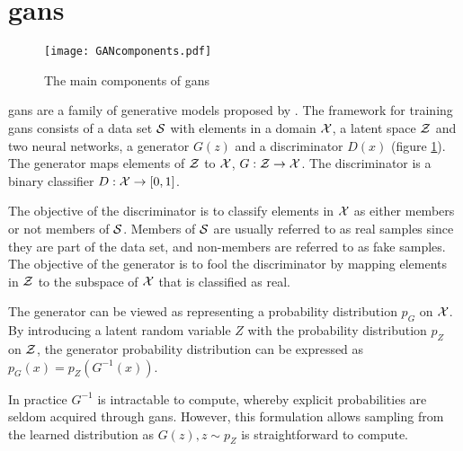
\section{\acrlong{gans}}

\begin{figure}
    \centering
    \texttt{[image: GANcomponents.pdf]}
    \caption{The main components of \acrshort{gans}}
    \label{fig:GAN}
\end{figure}

\acrfull{gans} are a family of generative models proposed by \textcite{goodfellow2014generative}. The framework for training \acrshort{gans} consists of a data set $\mathcal{S}$ with elements in a domain $\mathcal{X}$, a latent space $\mathcal{Z}$ and two neural networks, a generator $G(z)$ and a discriminator $D(x)$ (figure \ref{fig:GAN}). The generator maps elements of $\mathcal{Z}$ to $\mathcal{X}$, $G: \mathcal{Z} \rightarrow \mathcal{X}$. The discriminator is a binary classifier $D: \mathcal{X} \rightarrow [0, 1]$. 

The objective of the discriminator is to classify elements in $\mathcal{X}$ as either members or not members of $\mathcal{S}$. Members of $\mathcal{S}$ are usually referred to as real samples since they are part of the data set, and non-members are referred to as fake samples. The objective of the generator is to fool the discriminator by mapping elements in $\mathcal{Z}$ to the subspace of $\mathcal{X}$ that is classified as real. 

The generator can be viewed as representing a probability distribution $p_G$ on $\mathcal{X}$. By introducing a latent random variable $Z$ with the probability distribution $p_Z$ on $\mathcal{Z}$, the generator probability distribution can be expressed as $p_G(x) = p_Z(G^{-1}(x))$. 

In practice $G^{-1}$ is intractable to compute, whereby explicit probabilities are seldom acquired through \acrshort{gans}. However, this formulation allows sampling from the learned distribution as $G(z), z \sim p_Z$ is straightforward to compute. 

